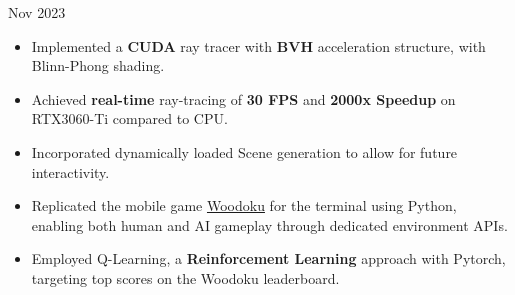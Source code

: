 \documentclass[10pt,a4paper,ragged2e,withhyper]{altacv}
\begin{document}
\begin{paracol}{2}

    {Nov 2023 
    }{}
    \begin{itemize}
        \item Implemented a \textbf{CUDA} ray tracer with \textbf{BVH} acceleration structure, with Blinn-Phong shading.
        \item Achieved \textbf{real-time} ray-tracing of \textbf{30 FPS} and \textbf{2000x Speedup} on RTX3060-Ti compared to CPU\@.
        \item Incorporated dynamically loaded Scene generation to allow for future interactivity.
    \end{itemize}




    \divider{}


    \begin{itemize}

        \item Replicated the mobile game \href{https://play.google.com/store/apps/details?id=com.tripledot.woodoku&hl=en_CA&gl=US}{Woodoku} for the terminal using Python, enabling both human and AI gameplay through dedicated environment APIs.
        \item Employed Q-Learning, a \textbf{Reinforcement Learning} approach with Pytorch, targeting top scores on the Woodoku leaderboard.


\end{itemize}
\end{paracol}
\end{document}
